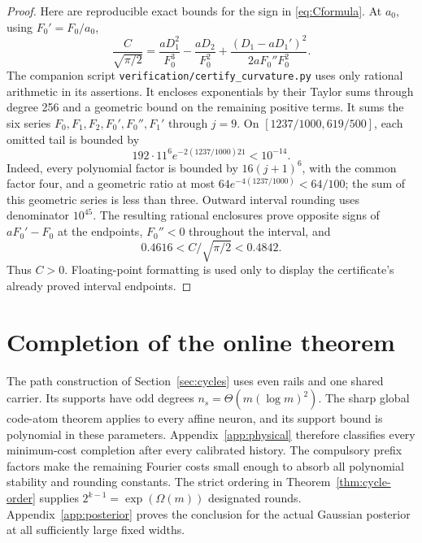 \documentclass[11pt]{article}
\theoremstyle{remark}\newtheorem{remark}[theorem]{Remark}
\begin{document}
\begin{proof}
Here are reproducible exact bounds for the sign in
\eqref{eq:Cformula}. At $a_0$, using $F_0'=F_0/a_0$,
\begin{equation}\label{eq:intervalC}
 \frac C{\sqrt{\pi/2}}
 =\frac{aD_1^2}{F_0^3}-\frac{aD_2}{F_0^2}
  +\frac{(D_1-aD_1')^2}{2aF_0''F_0^2}.
\end{equation}
The companion script \texttt{verification/certify\_curvature.py} uses
only rational arithmetic in its assertions. It encloses exponentials
by their Taylor sums through degree 256 and a geometric bound on the
remaining positive terms. It sums the six series
$F_0,F_1,F_2,F_0',F_0'',F_1'$ through $j=9$. On
$[1237/1000,619/500]$, each omitted tail is bounded by
\[
 192\cdot11^6 e^{-2(1237/1000)21}<10^{-14}.
\]
Indeed, every polynomial factor is bounded by $16(j+1)^6$, with the
common factor four, and a geometric ratio at most
$64e^{-4(1237/1000)}<64/100$; the sum of this geometric series is less
than three. Outward interval rounding uses denominator $10^{45}$.
The resulting rational enclosures prove opposite signs of
$aF_0'-F_0$ at the endpoints, $F_0''<0$ throughout the interval, and
\[
 0.4616< C/\sqrt{\pi/2}<0.4842.
\]
Thus $C>0$. Floating-point formatting is used only to display the
certificate's already proved interval endpoints.
\end{proof}







\section{Completion of the online theorem}

The path construction of Section~\ref{sec:cycles} uses even rails and
one shared carrier. Its supports have odd degrees
$n_s=\Theta(m(\log m)^2)$.
The sharp global code-atom theorem applies to every affine neuron,
and its support bound is polynomial in these parameters.
Appendix~\ref{app:physical} therefore classifies every minimum-cost
completion after every calibrated history. The compulsory prefix
factors make the remaining Fourier costs small enough to absorb all
polynomial stability and rounding constants. The strict ordering in
Theorem~\ref{thm:cycle-order} supplies
$2^{k-1}=\exp(\Omega(m))$ designated rounds.
Appendix~\ref{app:posterior} proves the conclusion for the actual
Gaussian posterior at all sufficiently large fixed widths.
\end{document}
